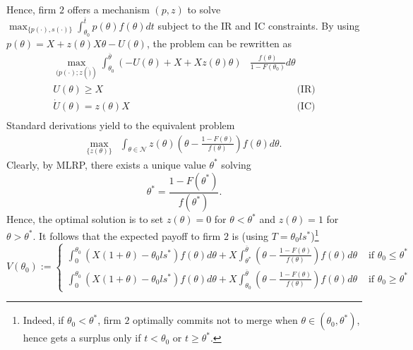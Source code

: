 \documentclass[a4paper]{article}
\newcommand{\N}{\mathcal N}
\renewcommand{\t}{\theta}
\begin{document}
Hence, firm $2$ offers a mechanism $(p,z)$ to solve $\max_{\{p(\cdot),s(\cdot)\}}\int_{\t_0}^{\overline t}p(\t)f(\t)dt$ subject to the IR and IC constraints. By using $p(\t)=X+z(\t)X\t-U(\t)$, the problem can be rewritten as
\begin{align*}
  \max_{(p(\cdot);z(\dot))} \int_{\t_0}^{\overline \t} \left(-U(\t)+X+Xz(\t)\t \right)&\frac{f(\t)}{1-F(\t_0)}d\t\\ 
  U(\t) \geq X & \hspace{2cm} \text{(IR)} \\ 
  \dot{U}(\t)=z(\t)X & \hspace{2cm} \text{(IC)} \\ 
\end{align*}
%
Standard derivations yield to the equivalent problem 
%
\begin{align*}
\max_{\{z(\t)\}} &\int_{\t\in \N}z(\t)\left( \t-\frac{1-F(\t)}{f(\t)}\right)f(\t)d\t.
\end{align*}
%
Clearly, by MLRP, there exists a unique value $\t^*$ solving
%
\[
\t^*=\frac{1-F(\t^*)}{f(\t^*)}.
\]
%
Hence, the optimal solution is to set $z(\t)=0$ for $\t<\t^*$ and $z(\t)=1$ for $\t>\t^*$. It follows that the expected payoff to firm $2$ is (using $T=\t_0 l s^*$)\footnote{
  Indeed, if $\t_0<\t^*$, firm $2$ optimally commits not to merge when $\theta\in (\t_0,\t^*)$, hence gets a surplus only if $t< \t_0$ or $t\geq \t^*$.
}
%
\begin{equation}\label{eq:V-t0}
  V(\t_0):=\begin{cases}
    \int_0^{\t_0} (X(1+\t)-\t_0 l s^*)f(\t)d\t +X \int_{\t^*}^{\overline \t}\left(\t-\frac{1-F(\t)}{f(\t)}\right)f(\t)d\t & \text{ if } \t_0\leq\t^*\\ 
    \int_0^{\t_0} (X(1+\t)-\t_0 l s^*)f(\t)d\t +X \int_{\t_0}^{\overline \t}\left(\t-\frac{1-F(\t)}{f(\t)}\right)f(\t)d\t & \text{ if } \t_0\geq\t^*
  \end{cases}
\end{equation}
\end{document}
